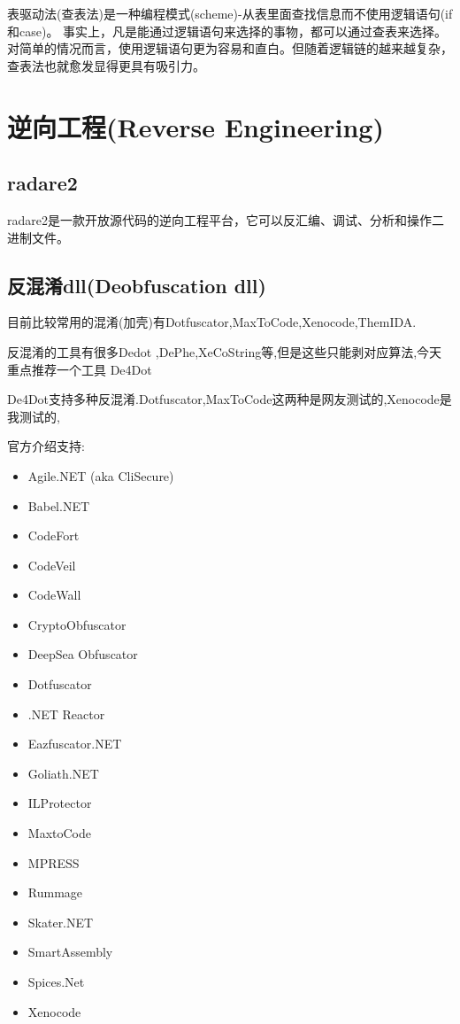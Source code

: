 \documentclass{book}
\begin{document}
表驱动法(查表法)是一种编程模式(scheme)-从表里面查找信息而不使用逻辑语句(if和case)。
事实上，凡是能通过逻辑语句来选择的事物，都可以通过查表来选择。
对简单的情况而言，使用逻辑语句更为容易和直白。但随着逻辑链的越来越复杂，查表法也就愈发显得更具有吸引力。

\section{逆向工程(Reverse Engineering)}

\subsection{radare2}

radare2是一款开放源代码的逆向工程平台，它可以反汇编、调试、分析和操作二进制文件。

\subsection{反混淆dll(Deobfuscation dll)}

目前比较常用的混淆(加壳)有Dotfuscator,MaxToCode,Xenocode,ThemIDA. 

反混淆的工具有很多Dedot ,DePhe,XeCoString等,但是这些只能剥对应算法,今天重点推荐一个工具 De4Dot 

De4Dot支持多种反混淆.Dotfuscator,MaxToCode这两种是网友测试的,Xenocode是我测试的,

官方介绍支持:

\begin{itemize}
\item{Agile.NET (aka CliSecure)}
\item{Babel.NET}
\item{CodeFort}
\item{CodeVeil}
\item{CodeWall}
\item{CryptoObfuscator}
\item{DeepSea Obfuscator}
\item{Dotfuscator}
\item{.NET Reactor}
\item{Eazfuscator.NET}
\item{Goliath.NET}
\item{ILProtector}
\item{MaxtoCode}
\item{MPRESS}
\item{Rummage}
\item{Skater.NET}
\item{SmartAssembly}
\item{Spices.Net}
\item{Xenocode}
\end{itemize}
\end{document}
